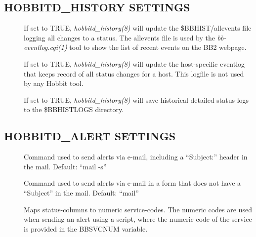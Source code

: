 \subsection{HOBBITD\_HISTORY SETTINGS}


 \begin{description}
\item[] If set to TRUE, \emph{hobbitd\_history(8)}
  will update the \$BBHIST/allevents file logging all changes to a
  status. The allevents file is used by the \emph{bb-eventlog.cgi(1)}
  tool to show the list of recent events on the BB2 webpage. 


 

\item[] If set to TRUE,
  \emph{hobbitd\_history(8)} will update the host-specific eventlog
  that keeps record of all status changes for a host. This logfile is
  not used by any Hobbit tool. 


 

\item[] If set to TRUE, \emph{hobbitd\_history(8)}
 will save historical detailed status-logs to the \$BBHISTLOGS directory. 

 


 


\end{description}

\subsection{HOBBITD\_ALERT SETTINGS}


 \begin{description}
\item[] Command used to send alerts via e-mail, including a ``Subject:'' header in the mail. Default: ``mail -s'' 

 

\item[] Command used to send alerts via e-mail in a form that does not have a ``Subject'' in the mail. Default: ``mail'' 

 

\item[] Maps status-columns to numeric
  service-codes. The numeric codes are used when sending an alert
  using a script, where the numeric code of the service is provided in
  the BBSVCNUM variable. 


 


 


\end{description}

